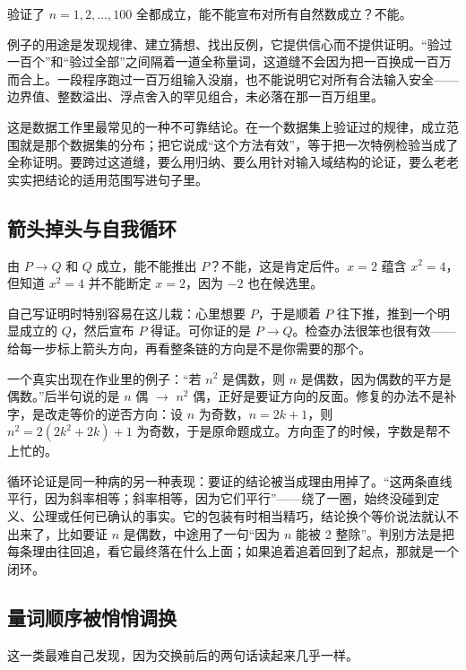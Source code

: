 验证了 \(n=1,2,\dots,100\) 全都成立，能不能宣布对所有自然数成立？不能。

例子的用途是发现规律、建立猜想、找出反例，它提供信心而不提供证明。``验过一百个''和``验过全部''之间隔着一道全称量词，这道缝不会因为把一百换成一百万而合上。一段程序跑过一百万组输入没崩，也不能说明它对所有合法输入安全——边界值、整数溢出、浮点舍入的罕见组合，未必落在那一百万组里。

这是数据工作里最常见的一种不可靠结论。在一个数据集上验证过的规律，成立范围就是那个数据集的分布；把它说成``这个方法有效''，等于把一次特例检验当成了全称证明。要跨过这道缝，要么用归纳、要么用针对输入域结构的论证，要么老老实实把结论的适用范围写进句子里。

\subsection{箭头掉头与自我循环}

由 \(P\to Q\) 和 \(Q\) 成立，能不能推出 \(P\)？不能，这是肯定后件。\(x=2\) 蕴含 \(x^2=4\)，但知道 \(x^2=4\) 并不能断定 \(x=2\)，因为 \(-2\) 也在候选里。

自己写证明时特别容易在这儿栽：心里想要 \(P\)，于是顺着 \(P\) 往下推，推到一个明显成立的 \(Q\)，然后宣布 \(P\) 得证。可你证的是 \(P\to Q\)。检查办法很笨也很有效——给每一步标上箭头方向，再看整条链的方向是不是你需要的那个。

一个真实出现在作业里的例子：``若 \(n^2\) 是偶数，则 \(n\) 是偶数，因为偶数的平方是偶数。''后半句说的是 \(n\) 偶 \(\to\) \(n^2\) 偶，正好是要证方向的反面。修复的办法不是补字，是改走等价的逆否方向：设 \(n\) 为奇数，\(n=2k+1\)，则 \(n^2=2(2k^2+2k)+1\) 为奇数，于是原命题成立。方向歪了的时候，字数是帮不上忙的。

循环论证是同一种病的另一种表现：要证的结论被当成理由用掉了。``这两条直线平行，因为斜率相等；斜率相等，因为它们平行''——绕了一圈，始终没碰到定义、公理或任何已确认的事实。它的包装有时相当精巧，结论换个等价说法就认不出来了，比如要证 \(n\) 是偶数，中途用了一句``因为 \(n\) 能被 2 整除''。判别方法是把每条理由往回追，看它最终落在什么上面；如果追着追着回到了起点，那就是一个闭环。

\subsection{量词顺序被悄悄调换}

这一类最难自己发现，因为交换前后的两句话读起来几乎一样。

